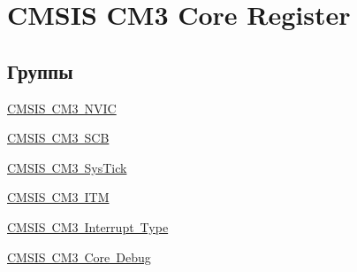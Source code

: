 \hypertarget{group___c_m_s_i_s___c_m3__core__register}{}\section{C\+M\+S\+IS C\+M3 Core Register}
\label{group___c_m_s_i_s___c_m3__core__register}
\subsection*{Группы}
\begin{DoxyCompactItemize}
\item 
\mbox{\hyperlink{group___c_m_s_i_s___c_m3___n_v_i_c}{C\+M\+S\+I\+S C\+M3 N\+V\+IC}}
\item 
\mbox{\hyperlink{group___c_m_s_i_s___c_m3___s_c_b}{C\+M\+S\+I\+S C\+M3 S\+CB}}
\item 
\mbox{\hyperlink{group___c_m_s_i_s___c_m3___sys_tick}{C\+M\+S\+I\+S C\+M3 Sys\+Tick}}
\item 
\mbox{\hyperlink{group___c_m_s_i_s___c_m3___i_t_m}{C\+M\+S\+I\+S C\+M3 I\+TM}}
\item 
\mbox{\hyperlink{group___c_m_s_i_s___c_m3___interrupt_type}{C\+M\+S\+I\+S C\+M3 Interrupt Type}}
\item 
\mbox{\hyperlink{group___c_m_s_i_s___c_m3___core_debug}{C\+M\+S\+I\+S C\+M3 Core Debug}}
\end{DoxyCompactItemize}
